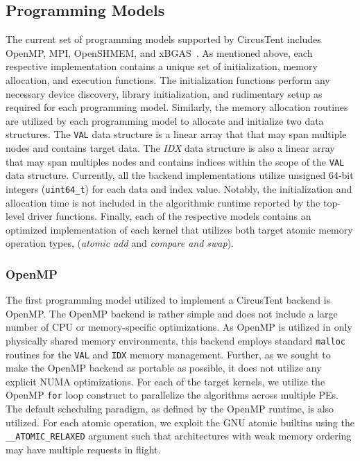 \subsection{Programming Models}
\label{subsec:programming_models}

The current set of programming models supported by CircusTent includes OpenMP, MPI, OpenSHMEM, and xBGAS~\cite{leidel2018xbgas}.
As mentioned above, each respective implementation contains a unique set of initialization, memory allocation, and execution functions.
The initialization functions perform any necessary device discovery, library initialization, and rudimentary setup as required for each programming model.
Similarly, the memory allocation routines are utilized by each programming model to allocate and initialize two data structures.
The \texttt{VAL} data structure is a linear array that that may span multiple nodes and contains target data.
The \textit{IDX} data structure is also a linear array that may span multiples nodes and contains indices within the scope of the \texttt{VAL} data structure.
Currently, all the backend implementations utilize unsigned 64-bit integers (\texttt{uint64\_t}) for each data and index value.  
Notably, the initialization and allocation time is not included in the algorithmic runtime reported by the top-level driver functions.
Finally, each of the respective models contains an optimized implementation of each kernel that utilizes both target atomic memory operation types, (\textit{atomic add} and \textit{compare and swap}).

\subsubsection{OpenMP}
\label{subsubsec:openmp}

The first programming model utilized to implement a CircusTent backend is OpenMP.  
The OpenMP backend is rather simple and does not include a large number of CPU or memory-specific optimizations.
As OpenMP is utilized in only physically shared memory environments, this backend employs standard \texttt{malloc} routines for the \texttt{VAL} and \texttt{IDX} memory management.
Further, as we sought to make the OpenMP backend as portable as possible, it does not utilize any explicit NUMA optimizations. 
For each of the target kernels, we utilize the OpenMP \texttt{for} loop construct to parallelize the algorithms across multiple PEs.
The default scheduling paradigm, as defined by the OpenMP runtime, is also utilized.
For each atomic operation, we exploit the GNU atomic builtins using the \texttt{\_\_ATOMIC\_RELAXED} argument such that architectures with weak memory ordering may have multiple requests in flight.  

